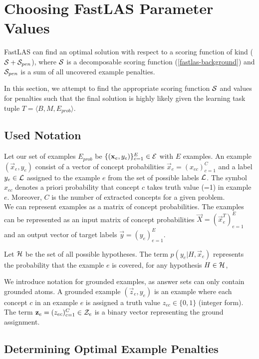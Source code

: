 \section{Choosing FastLAS Parameter Values}
\label{choosing-fastlas-parameter-values}

FastLAS can find an optimal solution with respect to a scoring function of kind ($\mathcal{S} + \mathcal{S}_{pen}$), where $\mathcal{S}$ is a decomposable scoring function (\ref{fastlas-background}) and $\mathcal{S}_{pen}$ is a sum of all uncovered example penalties.

In this section, we attempt to find the appropriate scoring function $\mathcal{S}$ and values for penalties such that the final solution is highly likely given the learning task tuple $T = \langle B, M, E_{prob} \rangle$. 

\subsection{Used Notation}

Let our set of examples $E_{prob}$ be $\{(\textbf{x}_e, y_e)\}_{e=1}^{E} \in \mathcal{E}$ with $E$ examples. 
An example $(\vec{x}_e, y_e)$ consist of a vector of concept probabilities $\vec{x}_e = (x_{ec})_{c=1}^C$ and a label $y_e \in \mathcal{L}$ assigned to the example $e$ from the set of possible labels $\mathcal{L}$.
The symbol $x_{ec}$ denotes a priori probability that concept $c$ takes truth value (=1) in example $e$.
Moreover, $C$ is the number of extracted concepts for a given problem. \\
We can represent examples as a matrix of concept probabilities.  
The examples can be represented as an input matrix of concept probabilities $\vec{X} = (\vec{x}_e^T)_{e=1}^E$ and an output vector of target labels $\vec{y} = (y_e)_{e=1}^E$.

Let $\mathcal{H}$ be the set of all possible hypotheses. The term $p(y_e|H, \vec{x}_{e})$ represents the probability that the example $e$ is covered, for any hypothesis $H \in \mathcal{H}$,


We introduce notation for grounded examples, as answer sets can only contain grounded atoms.
A grounded example $(\vec{z}_e, y_e)$ is an example where each concept $c$ in an example $e$ is assigned a truth value $z_{ec} \in \{0,1\}$ (integer form). 
The term $\textbf{z}_e = (z_{ec})_{c=1}^C \in \mathcal{Z}_e$  is a binary vector representing the ground assignment. 

\subsection{Determining Optimal Example Penalties}

